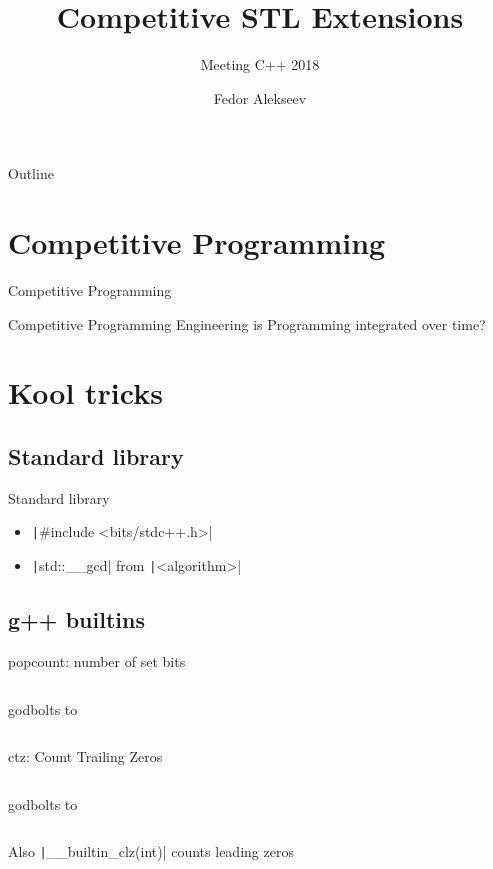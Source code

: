 \documentclass[12pt,notes,hyperref={unicode},aspectratio=169]{beamer}
\subtitle{Meeting C++ 2018}
\title{Competitive STL Extensions}
\author{Fedor Alekseev}
\institute{Moscow IPT: My pity}
\date{}
\begin{document}
\begin{frame}
  \titlepage
\end{frame}

\begin{frame}{Outline}
  \tableofcontents
\end{frame}

\section{Competitive Programming}
\begin{frame}{Competitive Programming}
\end{frame}

\begin{frame}{Competitive Programming}
  Engineering is Programming integrated over time?
\end{frame}

\section{Kool tricks}

\subsection{Standard library}
\begin{frame}[fragile]{Standard library}
  \begin{itemize}
    \item \texttt|#include <bits/stdc++.h>|
    \item \texttt|std::__gcd| from \texttt|<algorithm>|
  \end{itemize}
\end{frame}

\subsection{g++ builtins}

\begin{frame}[fragile]{popcount: number of set bits}
  \inputminted{c++}{popcnt.cc}
  godbolts to
  \inputminted{asm}{popcnt.asm}
\end{frame}

\begin{frame}[fragile]{ctz: Count Trailing Zeros}
  \inputminted{c++}{ctz.cc}
  godbolts to
  \inputminted{asm}{ctz.asm}

  Also \texttt|__builtin_clz(int)| counts leading zeros
\end{frame}
\end{document}
